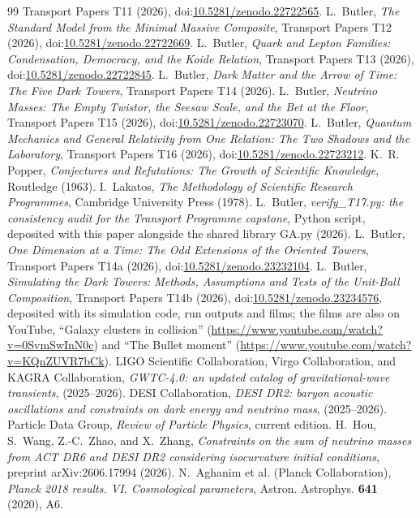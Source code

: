 \documentclass[11pt]{article}
\theoremstyle{definition}
\theoremstyle{plain}
\begin{document}
\begin{thebibliography}{99}
Transport Papers T11 (2026), doi:\href{https://doi.org/10.5281/zenodo.22722565}{10.5281/zenodo.22722565}.
 L.~Butler,
\emph{The Standard Model from the Minimal Massive Composite},
Transport Papers T12 (2026), doi:\href{https://doi.org/10.5281/zenodo.22722669}{10.5281/zenodo.22722669}.
 L.~Butler,
\emph{Quark and Lepton Families: Condensation, Democracy, and the Koide Relation},
Transport Papers T13 (2026), doi:\href{https://doi.org/10.5281/zenodo.22722845}{10.5281/zenodo.22722845}.
 L.~Butler,
\emph{Dark Matter and the Arrow of Time: The Five Dark Towers},
Transport Papers T14 (2026).
 L.~Butler,
\emph{Neutrino Masses: The Empty Twistor, the Seesaw Scale, and the Bet at the Floor},
Transport Papers T15 (2026), doi:\href{https://doi.org/10.5281/zenodo.22723070}{10.5281/zenodo.22723070}.
 L.~Butler,
\emph{Quantum Mechanics and General Relativity from One Relation: The Two Shadows and the Laboratory},
Transport Papers T16 (2026), doi:\href{https://doi.org/10.5281/zenodo.22723212}{10.5281/zenodo.22723212}.
 K.~R. Popper,
\emph{Conjectures and Refutations: The Growth of Scientific Knowledge},
Routledge (1963).
 I.~Lakatos,
\emph{The Methodology of Scientific Research Programmes},
Cambridge University Press (1978).
 L.~Butler,
\emph{verify\_T17.py: the consistency audit for the Transport Programme capstone},
Python script, deposited with this paper alongside the shared library GA.py (2026).
 L.~Butler,
\emph{One Dimension at a Time: The Odd Extensions of the Oriented Towers},
Transport Papers T14a (2026), doi:\href{https://doi.org/10.5281/zenodo.23232104}{10.5281/zenodo.23232104}.
 L.~Butler,
\emph{Simulating the Dark Towers: Methods, Assumptions and Tests of the Unit-Ball Composition},
Transport Papers T14b (2026), doi:\href{https://doi.org/10.5281/zenodo.23234576}{10.5281/zenodo.23234576}, deposited with its simulation code, run outputs and films; the films are also on YouTube, ``Galaxy clusters in collision'' (\url{https://www.youtube.com/watch?v=0SvmSwInN0c}) and ``The Bullet moment'' (\url{https://www.youtube.com/watch?v=KQnZUVR7bCk}).
 LIGO Scientific Collaboration, Virgo Collaboration, and KAGRA Collaboration,
\emph{GWTC-4.0: an updated catalog of gravitational-wave transients},
(2025--2026).
 DESI Collaboration,
\emph{DESI DR2: baryon acoustic oscillations and constraints on dark energy and neutrino mass},
(2025--2026).
 Particle Data Group,
\emph{Review of Particle Physics},
current edition.
 H.~Hou, S.~Wang, Z.-C.~Zhao, and X.~Zhang,
\emph{Constraints on the sum of neutrino masses from ACT DR6 and DESI DR2 considering isocurvature initial conditions},
preprint arXiv:2606.17994 (2026).
 N.~Aghanim et al. (Planck Collaboration),
\emph{Planck 2018 results. VI. Cosmological parameters},
Astron. Astrophys. \textbf{641} (2020), A6.
\end{thebibliography}
\end{document}
